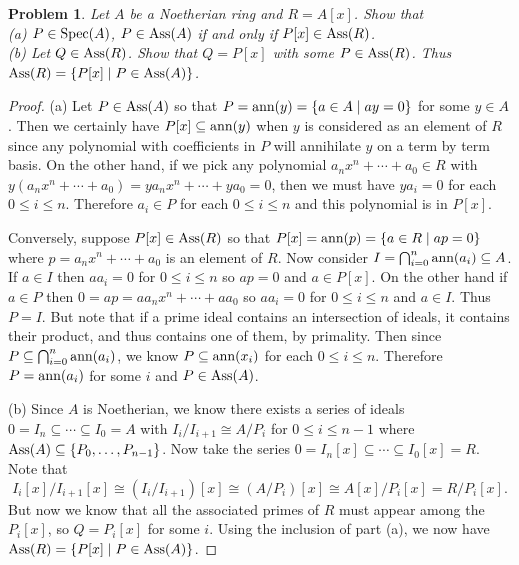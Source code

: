 \documentclass{article}
\newcommand{\ass}{\textup{Ass}}
\newcommand{\ann}{\textup{ann}}
\newcommand{\spec}{\textup{Spec}}
\newtheorem{problem}{Problem}
\begin{document}
\begin{problem}
Let $A$ be a Noetherian ring and $R = A[x]$. Show that\\
(a) $P \in \spec(A)$, $P \in \ass(A)$ if and only if $P[x] \in \ass(R)$.\\
(b) Let $Q \in \ass(R)$. Show that $Q = P[x]$ with some $P \in \ass(R)$. Thus $\ass(R) = \{P[x] \mid P \in \ass(A)\}$.
\end{problem}
\begin{proof}
(a) Let $P \in \ass(A)$ so that $P = \ann(y) = \{a \in A \mid ay = 0\}$ for some $y \in A$. Then we certainly have $P[x] \subseteq \ann(y)$ when $y$ is considered as an element of $R$ since any polynomial with coefficients in $P$ will annihilate $y$ on a term by term basis. On the other hand, if we pick any polynomial $a_nx^n + \cdots + a_0 \in R$ with $y(a_nx^n + \cdots + a_0) = ya_nx^n + \cdots + ya_0 = 0$, then we must have $ya_i = 0$ for each $0 \leq i \leq n$. Therefore $a_i \in P$ for each $0 \leq i \leq n$ and this polynomial is in $P[x]$.

Conversely, suppose $P[x] \in \ass(R)$ so that $P[x] = \ann(p) = \{a \in R \mid ap = 0\}$ where $p = a_n x^n + \cdots + a_0$ is an element of $R$. Now consider $I = \bigcap_{i=0}^n \ann(a_i) \subseteq A$. If $a \in I$ then $aa_i = 0$ for $0 \leq i \leq n$ so $ap = 0$ and $a \in P[x]$. On the other hand if $a \in P$ then $0 = ap = aa_nx^n + \cdots + aa_0$ so $aa_i = 0$ for $0 \leq i \leq n$ and $a \in I$. Thus $P = I$. But note that if a prime ideal contains an intersection of ideals, it contains their product, and thus contains one of them, by primality. Then since $P \subseteq \bigcap_{i=0}^n \ann(a_i)$, we know $P \subseteq \ann(x_i)$ for each $0 \leq i \leq n$. Therefore $P = \ann(a_i)$ for some $i$ and $P \in \ass(A)$.

(b) Since $A$ is Noetherian, we know there exists a series of ideals $0 = I_n \subseteq \cdots \subseteq I_0 = A$ with $I_i/I_{i+1} \cong A/P_i$ for $0 \leq i \leq n-1$ where $\ass(A) \subseteq \{P_0, \dots , P_{n-1}\}$. Now take the series $0 = I_n[x] \subseteq \cdots \subseteq I_0[x] = R$. Note that
\[
I_i[x]/I_{i+1}[x] \cong (I_i/I_{i+1})[x] \cong (A/P_i)[x] \cong A[x]/P_i[x] = R/P_i[x].
\]
But now we know that all the associated primes of $R$ must appear among the $P_i[x]$, so $Q = P_i[x]$ for some $i$. Using the inclusion of part (a), we now have $\ass(R) = \{P[x] \mid P \in \ass(A)\}$.
\end{proof}
\end{document}
